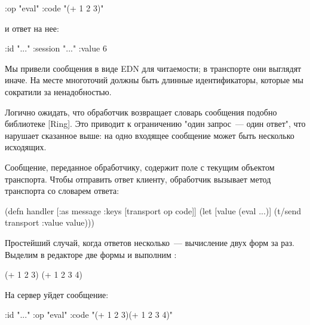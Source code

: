 \begin{english}
  \begin{clojure}
{:op "eval" :code "(+ 1 2 3)"}
  \end{clojure}
\end{english}

и ответ на нее:

\begin{english}
  \begin{clojure}
{:id "..." :session "..." :value 6}
  \end{clojure}
\end{english}

Мы привели сообщения в виде EDN для читаемости; в транспорте они выглядят иначе. На месте многоточий должны быть длинные идентификаторы, которые мы сократили за ненадобностью.

Логично ожидать, что обработчик возвращает словарь сообщения подобно библиотеке [Ring]. Это приводит к ограничению "один запрос~--- один ответ", что нарушает сказанное выше: на одно входящее сообщение может быть несколько исходящих.

Сообщение, переданное обработчику, содержит поле  с текущим объектом транспорта. Чтобы отправить ответ клиенту, обработчик вызывает метод  транспорта со словарем ответа:

\begin{english}
  \begin{clojure}
(defn handler [{:as message
                :keys [transport op code]}]
  (let [value (eval ...)]
    (t/send transport {:value value})))
  \end{clojure}
\end{english}

Простейший случай, когда ответов несколько~--- вычисление двух форм за раз. Выделим в редакторе две формы и выполним :

\begin{english}
  \begin{clojure}
(+ 1 2 3)
(+ 1 2 3 4)
  \end{clojure}
\end{english}

На сервер уйдет сообщение:

\begin{english}
  \begin{clojure}
{:id "..." :op "eval" :code "(+ 1 2 3)(+ 1 2 3 4)"}
  \end{clojure}
\end{english}

